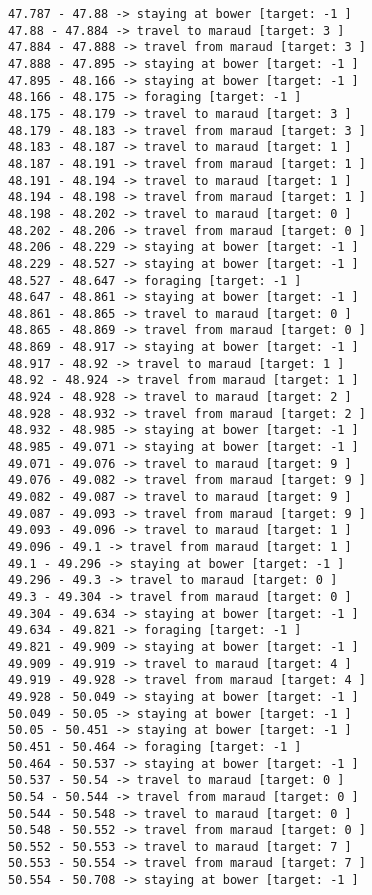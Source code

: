 \documentclass[11pt]{article}
\begin{document}
\begin{Verbatim}[commandchars=\\\{\}]
47.787 - 47.88 -> staying at bower [target: -1 ]
47.88 - 47.884 -> travel to maraud [target: 3 ]
47.884 - 47.888 -> travel from maraud [target: 3 ]
47.888 - 47.895 -> staying at bower [target: -1 ]
47.895 - 48.166 -> staying at bower [target: -1 ]
48.166 - 48.175 -> foraging [target: -1 ]
48.175 - 48.179 -> travel to maraud [target: 3 ]
48.179 - 48.183 -> travel from maraud [target: 3 ]
48.183 - 48.187 -> travel to maraud [target: 1 ]
48.187 - 48.191 -> travel from maraud [target: 1 ]
48.191 - 48.194 -> travel to maraud [target: 1 ]
48.194 - 48.198 -> travel from maraud [target: 1 ]
48.198 - 48.202 -> travel to maraud [target: 0 ]
48.202 - 48.206 -> travel from maraud [target: 0 ]
48.206 - 48.229 -> staying at bower [target: -1 ]
48.229 - 48.527 -> staying at bower [target: -1 ]
48.527 - 48.647 -> foraging [target: -1 ]
48.647 - 48.861 -> staying at bower [target: -1 ]
48.861 - 48.865 -> travel to maraud [target: 0 ]
48.865 - 48.869 -> travel from maraud [target: 0 ]
48.869 - 48.917 -> staying at bower [target: -1 ]
48.917 - 48.92 -> travel to maraud [target: 1 ]
48.92 - 48.924 -> travel from maraud [target: 1 ]
48.924 - 48.928 -> travel to maraud [target: 2 ]
48.928 - 48.932 -> travel from maraud [target: 2 ]
48.932 - 48.985 -> staying at bower [target: -1 ]
48.985 - 49.071 -> staying at bower [target: -1 ]
49.071 - 49.076 -> travel to maraud [target: 9 ]
49.076 - 49.082 -> travel from maraud [target: 9 ]
49.082 - 49.087 -> travel to maraud [target: 9 ]
49.087 - 49.093 -> travel from maraud [target: 9 ]
49.093 - 49.096 -> travel to maraud [target: 1 ]
49.096 - 49.1 -> travel from maraud [target: 1 ]
49.1 - 49.296 -> staying at bower [target: -1 ]
49.296 - 49.3 -> travel to maraud [target: 0 ]
49.3 - 49.304 -> travel from maraud [target: 0 ]
49.304 - 49.634 -> staying at bower [target: -1 ]
49.634 - 49.821 -> foraging [target: -1 ]
49.821 - 49.909 -> staying at bower [target: -1 ]
49.909 - 49.919 -> travel to maraud [target: 4 ]
49.919 - 49.928 -> travel from maraud [target: 4 ]
49.928 - 50.049 -> staying at bower [target: -1 ]
50.049 - 50.05 -> staying at bower [target: -1 ]
50.05 - 50.451 -> staying at bower [target: -1 ]
50.451 - 50.464 -> foraging [target: -1 ]
50.464 - 50.537 -> staying at bower [target: -1 ]
50.537 - 50.54 -> travel to maraud [target: 0 ]
50.54 - 50.544 -> travel from maraud [target: 0 ]
50.544 - 50.548 -> travel to maraud [target: 0 ]
50.548 - 50.552 -> travel from maraud [target: 0 ]
50.552 - 50.553 -> travel to maraud [target: 7 ]
50.553 - 50.554 -> travel from maraud [target: 7 ]
50.554 - 50.708 -> staying at bower [target: -1 ]

\end{Verbatim}
\end{document}
